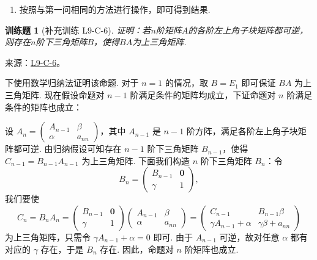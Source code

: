 \documentclass[12pt,fontset=fandol]{ctexart}
\newtheorem{exercise}{训练题}[section]
\begin{document}
\begin{solve}
\begin{enumerate}
                \item 按照与第一问相同的方法进行操作，即可得到结果.
            \end{enumerate}
\end{solve}

\begin{exercise}[补充训练 L9-C-6]\label{prob:L9-C-6}
证明：若$n$阶矩阵$A$的各阶左上角子块矩阵都可逆，则存在$n$阶下三角矩阵$B$，使得$BA$为上三角矩阵.
\end{exercise}
\noindent 来源：\href{https://github.com/yhwu-is/Linear-Algebra-Left-Undone/blob/new/%E8%AE%B2%E4%B9%89/%E4%B8%93%E9%A2%98/9%20%E7%9F%A9%E9%98%B5%E8%BF%90%E7%AE%97%E8%BF%9B%E9%98%B6.tex}{L9-C-6}。
\begin{solve}
下使用数学归纳法证明该命题. 对于 $n=1$ 的情况，取 $B=E_1$ 即可保证 $BA$ 为上三角矩阵. 现在假设命题对 $n-1$ 阶满足条件的矩阵均成立，下证命题对 $n$ 阶满足条件的矩阵也成立：

            设 $A_n = \begin{pmatrix}
                A_{n-1} & \beta \\
                \alpha  & a_{nn}
            \end{pmatrix}$，其中 $A_{n-1}$ 是 $n-1$ 阶方阵，满足各阶左上角子块矩阵都可逆. 由归纳假设可知存在 $n-1$ 阶下三角矩阵 $B_{n-1}$，使得 $C_{n-1} = B_{n-1}A_{n-1}$ 为上三角矩阵. 下面我们构造 $n$ 阶下三角矩阵 $B_n$：令
            \[
                B_n = \begin{pmatrix}
                    B_{n-1} & \mathbf{0} \\
                    \gamma  & 1
                \end{pmatrix},
            \]
            我们要使
            \[
                C_n = B_n A_n = \begin{pmatrix}
                    B_{n-1} & \mathbf{0} \\
                    \gamma  & 1
                \end{pmatrix} \begin{pmatrix}
                    A_{n-1} & \beta \\
                    \alpha  & a_{nn}
                \end{pmatrix} = \begin{pmatrix}
                    C_{n-1}                 & B_{n-1} \beta         \\
                    \gamma A_{n-1} + \alpha & \gamma \beta + a_{nn}
                \end{pmatrix}
            \]
            为上三角矩阵，只需令 $\gamma A_{n-1} + \alpha = 0$ 即可. 由于 $A_{n-1}$ 可逆，故对任意 $\alpha$ 都有对应的 $\gamma$ 存在，于是 $B_n$ 存在. 因此，命题对 $n$ 阶矩阵也成立.
\end{solve}
\end{document}
